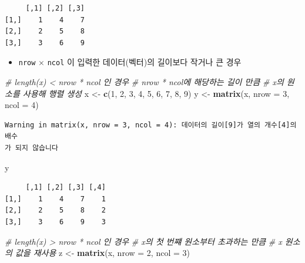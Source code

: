 \documentclass[
  11pt,
]{krantz}
\newenvironment{Shaded}{\begin{snugshade}}{\end{snugshade}}
\newcommand{\CommentTok}[1]{\textcolor[rgb]{0.37,0.37,0.37}{\textit{#1}}}
\newcommand{\DataTypeTok}[1]{\textcolor[rgb]{0.27,0.27,0.27}{#1}}
\newcommand{\DecValTok}[1]{\textcolor[rgb]{0.06,0.06,0.06}{#1}}
\newcommand{\KeywordTok}[1]{\textcolor[rgb]{0.27,0.27,0.27}{\textbf{#1}}}
\newcommand{\NormalTok}[1]{#1}
\newcommand{\StringTok}[1]{\textcolor[rgb]{0.5,0.5,0.5}{#1}}
\providecommand{\tightlist}{%
  \setlength{\itemsep}{0pt}\setlength{\parskip}{0pt}}
\begin{document}
\begin{verbatim}
     [,1] [,2] [,3]
[1,]    1    4    7
[2,]    2    5    8
[3,]    3    6    9
\end{verbatim}

\normalsize

\begin{itemize}
\tightlist
\item
  \texttt{nrow} \(\times\) \texttt{ncol} 이 입력한 데이터(벡터)의 길이보다 작거나 큰 경우
\end{itemize}

\footnotesize

\begin{Shaded}
\begin{Highlighting}[]
\CommentTok{# length(x) < nrow * ncol 인 경우 }
\CommentTok{# nrow * ncol에 해당하는 길이 만큼}
\CommentTok{# x의 원소를 사용해 행렬 생성}
\NormalTok{x <-}\StringTok{ }\KeywordTok{c}\NormalTok{(}\DecValTok{1}\NormalTok{, }\DecValTok{2}\NormalTok{, }\DecValTok{3}\NormalTok{, }\DecValTok{4}\NormalTok{, }\DecValTok{5}\NormalTok{, }\DecValTok{6}\NormalTok{, }\DecValTok{7}\NormalTok{, }\DecValTok{8}\NormalTok{, }\DecValTok{9}\NormalTok{)}
\NormalTok{y <-}\StringTok{ }\KeywordTok{matrix}\NormalTok{(x, }\DataTypeTok{nrow =} \DecValTok{3}\NormalTok{, }\DataTypeTok{ncol =} \DecValTok{4}\NormalTok{)}
\end{Highlighting}
\end{Shaded}

\begin{verbatim}
Warning in matrix(x, nrow = 3, ncol = 4): 데이터의 길이[9]가 열의 개수[4]의 배수
가 되지 않습니다
\end{verbatim}

\begin{Shaded}
\begin{Highlighting}[]
\NormalTok{y}
\end{Highlighting}
\end{Shaded}

\begin{verbatim}
     [,1] [,2] [,3] [,4]
[1,]    1    4    7    1
[2,]    2    5    8    2
[3,]    3    6    9    3
\end{verbatim}

\begin{Shaded}
\begin{Highlighting}[]
\CommentTok{# length(x) > nrow * ncol 인 경우 }
\CommentTok{# x의 첫 번쨰 원소부터 초과하는 만큼 }
\CommentTok{# x 원소의 값을 재사용}
\NormalTok{z <-}\StringTok{ }\KeywordTok{matrix}\NormalTok{(x, }\DataTypeTok{nrow =} \DecValTok{2}\NormalTok{, }\DataTypeTok{ncol =} \DecValTok{3}\NormalTok{)}
\end{Highlighting}
\end{Shaded}
\end{document}
